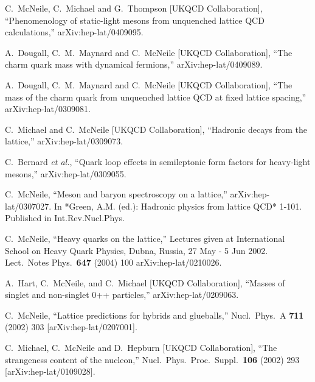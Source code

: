 \begin{thebibliography}{130}
C.~McNeile, C.~Michael and G.~Thompson  [UKQCD Collaboration],
``Phenomenology of static-light mesons from unquenched lattice QCD
calculations,''
arXiv:hep-lat/0409095.



A.~Dougall, C.~M.~Maynard and C.~McNeile  [UKQCD Collaboration],
``The charm quark mass with dynamical fermions,''
arXiv:hep-lat/0409089.


A.~Dougall, C.~M.~Maynard and C.~McNeile  [UKQCD Collaboration],
``The mass of the charm quark from unquenched lattice QCD at fixed
lattice spacing,''
arXiv:hep-lat/0309081.



C.~Michael and C.~McNeile  [UKQCD Collaboration],
``Hadronic decays from the lattice,''
arXiv:hep-lat/0309073.


C.~Bernard {\it et al.},
``Quark loop effects in semileptonic form factors for heavy-light
mesons,''
arXiv:hep-lat/0309055.



C.~McNeile,
``Meson and baryon spectroscopy on a lattice,''
arXiv:hep-lat/0307027.
 In *Green, A.M. (ed.): Hadronic physics from lattice QCD* 1-101.
Published in Int.Rev.Nucl.Phys. 



C.~McNeile,
``Heavy quarks on the lattice,''
Lectures given at International School on Heavy Quark Physics, Dubna,
Russia, 27 May - 5
Jun 2002.
Lect.\ Notes Phys.\  {\bf 647} (2004) 100
arXiv:hep-lat/0210026.
%

A.~Hart, C.~McNeile, and C.~Michael  [UKQCD Collaboration],
``Masses of singlet and non-singlet 0++ particles,''
arXiv:hep-lat/0209063.

C.~McNeile,
``Lattice predictions for hybrids and glueballs,''
Nucl.\ Phys.\ A {\bf 711} (2002) 303
[arXiv:hep-lat/0207001].


C.~Michael, C.~McNeile and D.~Hepburn  [UKQCD Collaboration],
``The strangeness content of the nucleon,''
Nucl.\ Phys.\ Proc.\ Suppl.\  {\bf 106} (2002) 293
[arXiv:hep-lat/0109028].



\end{thebibliography}
